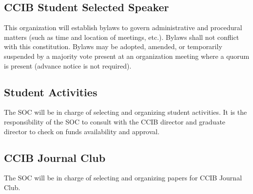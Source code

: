 \subsection{CCIB Student Selected Speaker}

This organization will establish bylaws to govern administrative and procedural matters (such as
time and location of meetings, etc.). Bylaws shall not conflict with this constitution. Bylaws may
be adopted, amended, or temporarily suspended by a majority vote present at an organization
meeting where a quorum is present (advance notice is not required).

\subsection{Student Activities}

The SOC will be in charge of selecting and organizing student activities. It is the responsibility of the SOC to consult with the CCIB director and graduate director to check on funds availability and approval.

\subsection{CCIB Journal Club}

The SOC will be in charge of selecting and organizing papers for CCIB Journal Club.



